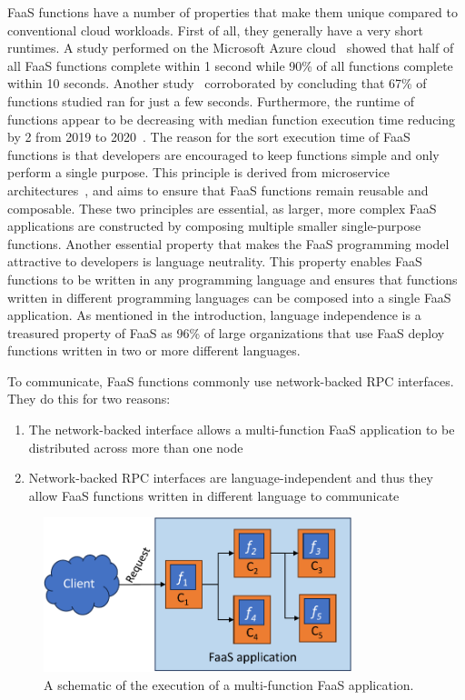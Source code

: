 \documentclass[../main.tex]{subfiles}
\begin{document}
\begin{refsection}
FaaS functions have a number of properties that make them unique
compared to conventional cloud workloads. First of all, they generally
have a very short runtimes. A study performed on the Microsoft Azure
cloud~\cite{shahrad20_server_wild} showed that half of all FaaS
functions complete within 1 second while 90\% of all functions
complete within 10 seconds. Another
study~\cite{eismann20_review_server_use_cases_their_charac}
corroborated by concluding that 67\% of functions studied ran for just
a few seconds.  Furthermore, the runtime of functions appear to be
decreasing with median function execution time reducing by
2\texttimes{} from 2019 to 2020~\cite{serverless_state_21}. The reason
for the sort execution time of FaaS functions is that developers are
encouraged to keep functions simple and only perform a single
purpose. This principle is derived from microservice
architectures~\cite{gan19_open_sourc_bench_suite_micros}, and aims to
ensure that FaaS functions remain reusable and composable. These two
principles are essential, as larger, more complex FaaS applications
are constructed by composing multiple smaller single-purpose
functions. Another essential property that makes the FaaS programming
model attractive to developers is language neutrality. This property
enables FaaS functions to be written in any programming language and
ensures that functions written in different programming languages can
be composed into a single FaaS application. As mentioned in the
introduction, language independence is a treasured property of FaaS as
96\% of large organizations that use FaaS deploy functions written in
two or more different languages\cite{serverless_state}.

To communicate, FaaS functions commonly use network-backed RPC interfaces. They do this for two reasons:

\begin{enumerate}
\item The network-backed interface allows a multi-function FaaS application to be distributed across more than one node
\item Network-backed RPC interfaces are language-independent and thus they allow FaaS functions written in different language to communicate
\end{enumerate}

\begin{figure}[ht]
  \centering
\includegraphics[width=0.8\textwidth]{papers/paper5-cofaas/figures/faas_application.pdf}
\caption{\label{fig:faas-app} A schematic of the execution of a multi-function FaaS application.}
\end{figure}


\end{refsection}
\end{document}
